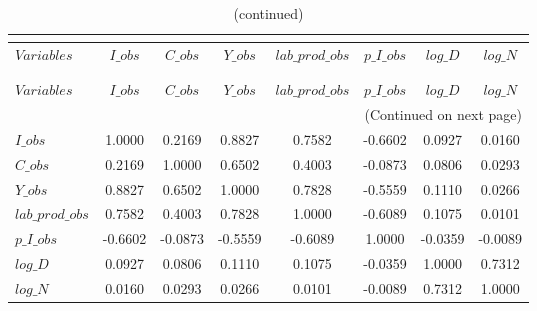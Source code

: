  
\begin{center}
\begin{longtable}{lccccccc} 
\caption{MATRIX OF CORRELATIONS}\\
 \label{Table:th_corr_matrix}\\
\toprule 
$Variables       $	 & 	 $           I\_obs$	 & 	 $           C\_obs$	 & 	 $           Y\_obs$	 & 	 $  lab\_prod\_obs$	 & 	 $       p\_I\_obs$	 & 	 $           log\_D$	 & 	 $           log\_N$\\
\midrule \endfirsthead 
\caption{(continued)}\\
 \toprule \\ 
$Variables       $	 & 	 $           I\_obs$	 & 	 $           C\_obs$	 & 	 $           Y\_obs$	 & 	 $  lab\_prod\_obs$	 & 	 $       p\_I\_obs$	 & 	 $           log\_D$	 & 	 $           log\_N$\\
\midrule \endhead 
\midrule \multicolumn{8}{r}{(Continued on next page)} \\ \bottomrule \endfoot 
\bottomrule \endlastfoot 
$I\_obs          $	 & 	            1.0000	 & 	            0.2169	 & 	            0.8827	 & 	            0.7582	 & 	           -0.6602	 & 	            0.0927	 & 	            0.0160 \\ 
$C\_obs          $	 & 	            0.2169	 & 	            1.0000	 & 	            0.6502	 & 	            0.4003	 & 	           -0.0873	 & 	            0.0806	 & 	            0.0293 \\ 
$Y\_obs          $	 & 	            0.8827	 & 	            0.6502	 & 	            1.0000	 & 	            0.7828	 & 	           -0.5559	 & 	            0.1110	 & 	            0.0266 \\ 
$lab\_prod\_obs  $	 & 	            0.7582	 & 	            0.4003	 & 	            0.7828	 & 	            1.0000	 & 	           -0.6089	 & 	            0.1075	 & 	            0.0101 \\ 
$p\_I\_obs       $	 & 	           -0.6602	 & 	           -0.0873	 & 	           -0.5559	 & 	           -0.6089	 & 	            1.0000	 & 	           -0.0359	 & 	           -0.0089 \\ 
$log\_D          $	 & 	            0.0927	 & 	            0.0806	 & 	            0.1110	 & 	            0.1075	 & 	           -0.0359	 & 	            1.0000	 & 	            0.7312 \\ 
$log\_N          $	 & 	            0.0160	 & 	            0.0293	 & 	            0.0266	 & 	            0.0101	 & 	           -0.0089	 & 	            0.7312	 & 	            1.0000 \\ 
\end{longtable}
 \end{center}
